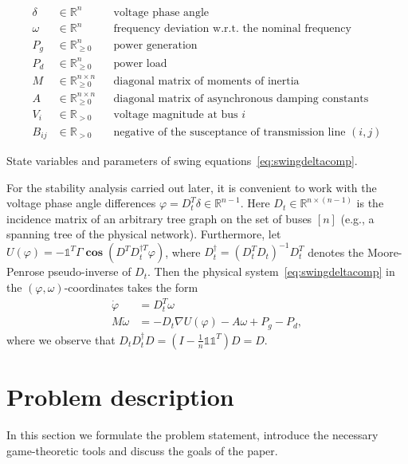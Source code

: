 \documentclass[journal]{IEEEtran}
\newcommand{\w}{\omega}
\newcommand{\1}{\mathds 1}
\newcommand{\vp}{\varphi}
\newcommand{\realnonnegative}{{\mathbb{R}}_{\ge 0}}
\newcommand{\until}[1]{[#1]}
\DeclareMathOperator{\Cos}{\mathbf{cos}}
\theoremstyle{remark}
\theoremstyle{definition}
\begin{document}
\begin{table}[htb]\vspace*{-3mm}
  \begin{align*}
    \delta&\in \mathbb R^n && \text{voltage phase angle}  \\
    \w&\in\mathbb R^n & &  \text{frequency deviation w.r.t. the nominal frequency}  \\
    P_{g}&\in\realnonnegative^n & & \text{power generation} \\
    P_{d}&\in\realnonnegative^n  && \text{power load}  \\
    M&\in\mathbb R_{\ge0}^{n\times n} & & \text{diagonal matrix of
      moments of inertia}
    \\
    A&\in\realnonnegative^{n\times n}& & \text{diagonal matrix of
      asynchronous damping constants}
    \\
    V_{i}&\in\mathbb R_{>0}& & \text{voltage magnitude at bus } i
    \\ %
    B_{ij}&\in\mathbb R_{>0}& & \text{negative of the susceptance of
      transmission line } (i,j)
  \end{align*}%
  \caption{State variables and parameters of swing
    equations~\eqref{eq:swingdeltacomp}.}\label{tab:par3SG}
\end{table}

For the stability analysis carried out later, it is convenient to work
with the voltage phase angle differences $\vp=D_t^T\delta\in\mathbb
R^{n-1}$.  Here $D_t\in\mathbb R^{n\times (n-1)}$ is the incidence
matrix of an arbitrary tree graph on the set of buses $\until{n}$
(e.g., a spanning tree of the physical network). Furthermore, let $
U(\vp)=-\1^T\Gamma\Cos(D^TD_t^{\dagger T}\vp)$, where
$D_t^\dagger=(D_t^TD_t)^{-1}D_t^T$ denotes the Moore-Penrose
pseudo-inverse of $D_t$. Then the physical
system~\eqref{eq:swingdeltacomp} in the $(\vp,\w)$-coordinates takes
the form
\begin{equation}\label{eq:swingeqU}
  \begin{aligned}
    \dot \vp&=D_t^T\w\\
    M\dot \w&=-D_t\nabla U(\vp)-A\w+P_g-P_d,
  \end{aligned}
\end{equation}
where we observe that $D_tD_t^{\dagger}D=(I-\frac1n\1\1^T)D=D$.

\section{Problem description}\label{sec:problem-statement}
In this section we formulate the problem statement, introduce the
necessary game-theoretic tools and discuss the goals of the paper.  
\end{document}

